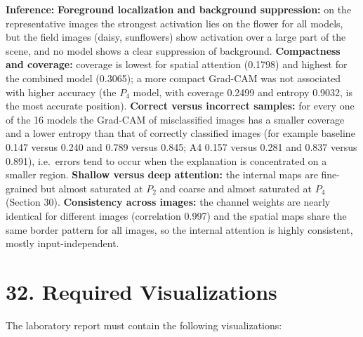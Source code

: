\documentclass[10pt]{article}
\begin{document}
\textbf{Inference:} \textbf{Foreground localization and background suppression:} on the representative images the strongest activation lies on the flower for all models, but the field images (daisy, sunflowers) show activation over a large part of the scene, and no model shows a clear suppression of background.
\textbf{Compactness and coverage:} coverage is lowest for spatial attention (0.1798) and highest for the combined model (0.3065); a more compact Grad-CAM was not associated with higher accuracy (the $P_4$ model, with coverage 0.2499 and entropy 0.9032, is the most accurate position).
\textbf{Correct versus incorrect samples:} for every one of the 16 models the Grad-CAM of misclassified images has a smaller coverage and a lower entropy than that of correctly classified images (for example baseline 0.147 versus 0.240 and 0.789 versus 0.845; A4 0.157 versus 0.281 and 0.837 versus 0.891), i.e.\ errors tend to occur when the explanation is concentrated on a smaller region.
\textbf{Shallow versus deep attention:} the internal maps are fine-grained but almost saturated at $P_2$ and coarse and almost saturated at $P_4$ (Section 30).
\textbf{Consistency across images:} the channel weights are nearly identical for different images (correlation 0.997) and the spatial maps share the same border pattern for all images, so the internal attention is highly consistent, mostly input-independent.

\section*{32. Required Visualizations}

The laboratory report must contain the following visualizations:
\end{document}
